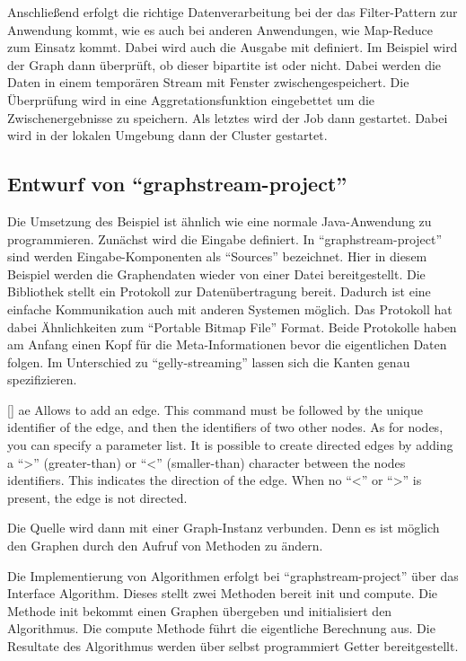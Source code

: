 Anschließend erfolgt die richtige Datenverarbeitung bei der das Filter-Pattern
zur Anwendung kommt, wie es auch bei anderen Anwendungen, wie Map-Reduce zum
Einsatz kommt. Dabei wird auch die Ausgabe mit definiert. Im Beispiel wird der
Graph dann überprüft, ob dieser bipartite ist oder nicht. Dabei werden die Daten
in einem temporären Stream mit Fenster zwischengespeichert. Die Überprüfung wird
in eine Aggretationsfunktion eingebettet um die Zwischenergebnisse zu speichern.
Als letztes wird der Job dann gestartet. Dabei wird in der lokalen Umgebung dann
der Cluster gestartet.

\subsection{Entwurf von \enquote{graphstream-project}}
Die Umsetzung des Beispiel ist ähnlich wie eine normale Java-Anwendung zu
programmieren. Zunächst wird die Eingabe definiert. In \enquote{graphstream-project}
sind werden Eingabe-Komponenten als \enquote{Sources} bezeichnet. Hier in diesem
Beispiel werden die Graphendaten wieder von einer Datei bereitgestellt. Die
Bibliothek stellt ein Protokoll zur Datenübertragung bereit. Dadurch ist eine
einfache Kommunikation auch mit anderen Systemen möglich. Das Protokoll hat dabei
Ähnlichkeiten zum \enquote{Portable Bitmap File} Format. Beide Protokolle haben
am Anfang einen Kopf für die Meta-Informationen bevor die eigentlichen Daten
folgen. Im Unterschied zu \enquote{gelly-streaming} lassen sich die Kanten
genau spezifizieren.

[\cite{Team2018}]{
ae Allows to add an edge. This command must be followed by the unique identifier
of the edge, and then the identifiers of two other nodes. As for nodes, you can
specify a parameter list. It is possible to create directed edges by adding a
“>” (greater-than) or “<” (smaller-than) character between the nodes identifiers.
This indicates the direction of the edge. When no “<” or “>” is present, the
edge is not directed.}

Die Quelle wird dann mit einer Graph-Instanz verbunden. Denn es ist möglich
den Graphen durch den Aufruf von Methoden zu ändern.

Die Implementierung von Algorithmen erfolgt bei \enquote{graphstream-project}
über das Interface Algorithm. Dieses stellt zwei Methoden bereit init und compute.
Die Methode init bekommt einen Graphen übergeben und initialisiert den
Algorithmus. Die compute Methode führt die eigentliche Berechnung aus.
Die Resultate des Algorithmus werden über selbst programmiert Getter
bereitgestellt.

